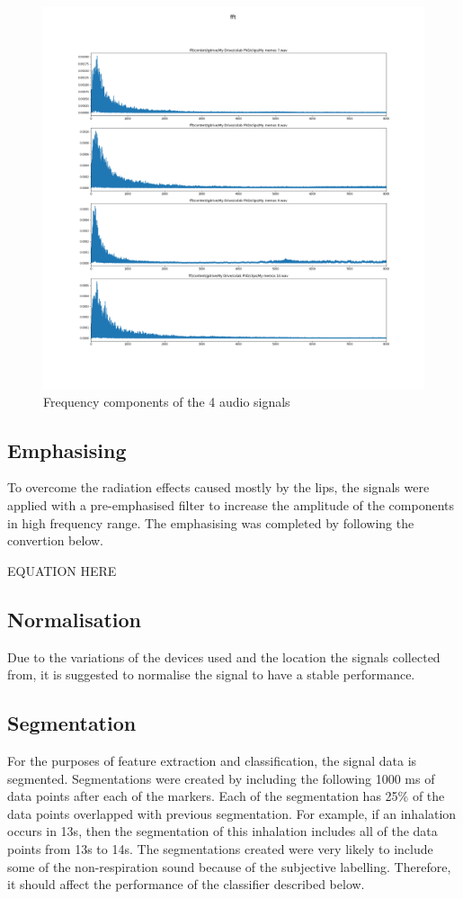 \begin{figure}[h]
    \centerline{\includegraphics[scale=0.25]{figures/fft.png}}
    \caption{Frequency components of the 4 audio signals}
    \label{fig:fft}
\end{figure}
\subsection{Emphasising}
To overcome the radiation effects caused mostly by the lips, the signals were applied with a pre-emphasised filter to increase the amplitude of the components in high frequency range. The emphasising was completed by following the convertion below.

EQUATION HERE
\subsection{Normalisation}
Due to the variations of the devices used and the location the signals collected from, it is suggested to normalise the signal to have a stable performance.

\subsection{Segmentation}
For the purposes of feature extraction and classification, the signal data is segmented. Segmentations were created by including the following 1000 ms of data points after each of the markers. Each of the segmentation has 25\% of the data points overlapped with previous segmentation. For example, if an inhalation occurs in 13s, then the segmentation of this inhalation includes all of the data points from 13s to 14s. The segmentations created were very likely to include some of the non-respiration sound because of the subjective labelling. Therefore, it should affect the performance of the classifier described below.

